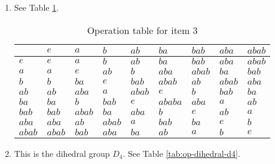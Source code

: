\documentclass{article}
\begin{document}
\begin{enumerate}
    \item See Table \ref{tab:op-exercise-5G3}.
        \begin{table}[]
            \centering
            \begin{tabular}{l|llllllll}
                & $e$   & $a$   & $b$   & $ab$  & $ba$   & $bab$ & $aba$ & $abab$\\ \hline
            $e$   & $e$   & $a$   & $b$   & $ab$  & $ba$   & $bab$ & $aba$ & $abab$\\
            $a$   & $a$   & $e$   & $ab$  & $b$   & $aba$  & $abab$& $ba$  & $bab$ \\
            $b$   & $b$   & $ba$  & $e$   & $bab$ & $abab$ & $ab$  & $abab$& $aba$ \\
            $ab$  & $ab$  & $aba$ & $a$   & $abab$& $e$    & $b$   & $bab$ & $ba$  \\
            $ba$  & $ba$  & $b$   & $bab$ & $e$   & $ababa$ & $aba$ & $a$   & $ab$  \\
            $bab$ & $bab$ & $abab$& $ba$  & $aba$ & $b$    & $e$   & $ab$  & $a$   \\
            $aba$ & $aba$ & $ab$  & $abab$& $a$   & $bab$  & $ba$  & $e$   & $b$   \\
            $abab$& $abab$& $bab$ & $aba$ & $ba$  & $ab$   & $a$   & $b$   & $e$  
            \end{tabular}
            \caption{Operation table for item 3}
            \label{tab:op-exercise-5G3}
        \end{table}    

    \item This is the dihedral group $D_4$. See Table \ref{tab:op-dihedral-d4}.


\end{enumerate}
\end{document}
